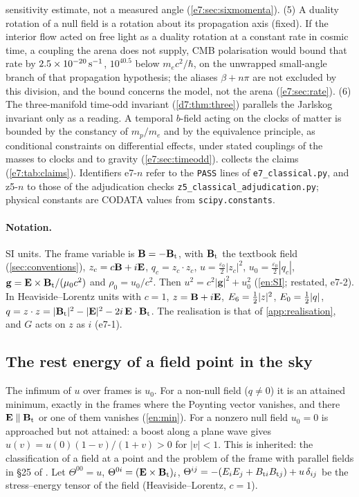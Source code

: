 sensitivity estimate, not a measured angle (\cref{e7:sec:sixmomenta}). (5) A duality rotation of a null field is a rotation about its
propagation axis (fixed). If the interior flow acted on free light as a duality rotation at a constant rate in cosmic time, a coupling the arena
does not supply, CMB polarisation would bound that rate by $2.5\times10^{-20}\,{\rm s^{-1}}$, $10^{40.5}$ below $m_ec^2/\hbar$, on the unwrapped
small-angle branch of that propagation hypothesis; the aliases $\beta+n\pi$ are not excluded by this division, and the bound concerns the model,
not the arena (\cref{e7:sec:rate}). (6) The three-manifold time-odd invariant (\cref{d7:thm:three}) parallels the Jarlskog invariant only as a reading. A temporal $b$-field acting on the clocks of matter is
bounded by the constancy of $m_p/m_e$ and by the equivalence principle, as conditional constraints on differential effects, under stated
couplings of the masses to clocks and to gravity (\cref{e7:sec:timeodd}).  collects the claims (\cref{e7:tab:claims}).
Identifiers e7-$n$ refer to the \texttt{PASS} lines of \texttt{e7\_classical.py}, and z5-$n$ to those of the adjudication checks
\texttt{z5\_classical\_adjudication.py}; physical constants are CODATA values from \texttt{scipy.constants}.

\paragraph{Notation.} SI units. The frame variable is $\mathbf B=-\mathbf B_{\rm t}$, with $\mathbf B_{\rm t}$ the textbook field (\cref{sec:conventions}), $z_c=c\mathbf B+i\mathbf E$,
$q_c=z_c\cdot z_c$, $u=\tfrac{\varepsilon_0}2|z_c|^2$, $u_0=\tfrac{\varepsilon_0}2|q_c|$, $\mathbf g=\mathbf E\times\mathbf B_{\rm t}/(\mu_0c^2)$ and $\rho_0=u_0/c^2$. Then
$u^2=c^2|\mathbf g|^2+u_0^2$ (\cref{en:SI}; restated, e7-2). In Heaviside--Lorentz units with $c=1$, $z=\mathbf B+i\mathbf E$, $E_6=\tfrac12|z|^2$,
$E_0=\tfrac12|q|$, $q=z\cdot z=|\mathbf B_{\rm t}|^2-|\mathbf E|^2-2i\,\mathbf E\cdot\mathbf B_{\rm t}$. The realisation is that of \cref{app:realisation}, and $G$ acts on $z$ as $i$ (e7-1).

\subsection{The rest energy of a field point in the sky}
\label{e7:sec:point}

The infimum of $u$ over frames is $u_0$. For a non-null field ($q\neq0$) it is an attained minimum, exactly in the frames where the Poynting
vector vanishes, and there $\mathbf E\parallel\mathbf B_{\rm t}$ or one of them vanishes (\cref{en:min}). For a nonzero null field $u_0=0$ is approached but not
attained: a boost along a plane wave gives $u(v)=u(0)(1-v)/(1+v)>0$ for $|v|<1$. This is inherited: the classification of a field at a point
\cite{Synge56} and the problem of the frame with parallel fields in \S25 of \cite{LandauLifshitz2}. Let
$\Theta^{00}=u$, $\Theta^{0i}=(\mathbf E\times\mathbf B_{\rm t})_i$, $\Theta^{ij}=-(E_iE_j+B_{{\rm t}i}B_{{\rm t}j})+u\,\delta_{ij}$ be the stress--energy tensor of the field
(Heaviside--Lorentz, $c=1$).

